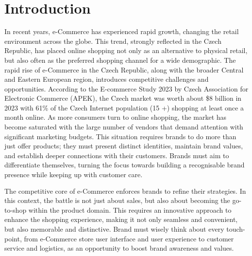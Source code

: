 \chapter*{Introduction}
\label{chap:introduction}
In recent years, e-Commerce has experienced rapid growth, changing the retail environment across the globe.
This trend, strongly reflected in the Czech Republic, has placed online shopping not only as an alternative to physical retail, but also often as the preferred shopping channel for a wide demographic.
The rapid rise of e-Commerce in the Czech Republic, along with the broader Central and Eastern European region, introduces competitive challenges and opportunities.
According to the \cite{ApekEcommerceStudy2023} E-commerce Study 2023 by Czech Association for Electronic Commerce (\ac{APEK}), the Czech market was worth about \$8 billion in 2023 with 61\% of the Czech Internet population (15 +) shopping at least once a month online.
As more consumers turn to online shopping, the market has become saturated with the large number of vendors that demand attention with significant marketing budgets.
This situation requires brands to do more than just offer products; they must present distinct identities, maintain brand values, and establish deeper connections with their customers.
Brands must aim to differentiate themselves, turning the focus towards building a recognisable brand presence while keeping up with customer care. 

The competitive core of e-Commerce enforces brands to refine their strategies. In this context, the battle is not just about sales, but also about becoming the go-to-shop within the product domain. This requires an innovative approach to enhance the shopping experience, making it not only seamless and convenient, but also memorable and distinctive. Brand must wisely think about every touch-point, from e-Commerce store user interface and user experience to customer service and logistics, as an opportunity to boost brand awareness and values.

